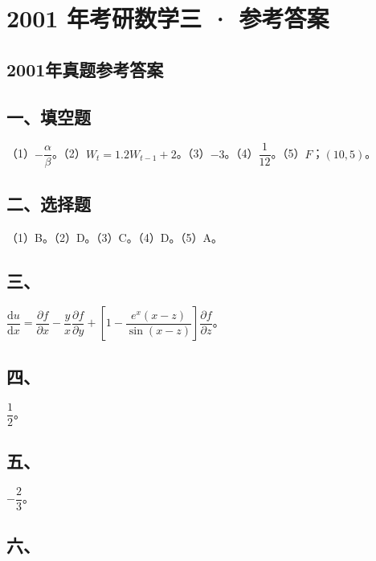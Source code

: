 \documentclass[UTF8,12pt]{ctexart}
\begin{document}
\section*{2001 年考研数学三 · 参考答案}
\subsection*{2001年真题参考答案}

\subsection*{一、填空题}

（1）\(\displaystyle -\dfrac{\displaystyle \alpha}{\displaystyle \beta}\)。（2）\(\displaystyle W_t=1.2W_{t-1}+2\)。（3）\(\displaystyle -3\)。（4）\(\displaystyle \dfrac{\displaystyle 1}{\displaystyle 12}\)。（5）\(\displaystyle F\)；\(\displaystyle (10,\allowbreak 5)\)。


\subsection*{二、选择题}

（1）B。（2）D。（3）C。（4）D。（5）A。


\subsection*{三、}

\(\displaystyle \dfrac{\displaystyle \mathrm du}{\displaystyle \mathrm dx}=\dfrac{\displaystyle \partial f}{\displaystyle \partial x}-\dfrac{\displaystyle y}{\displaystyle x}\dfrac{\displaystyle \partial f}{\displaystyle \partial y}+\left[1-\dfrac{\displaystyle e^x(x-z)}{\displaystyle \sin(x-z)}\right]\dfrac{\displaystyle \partial f}{\displaystyle \partial z}\)。


\subsection*{四、}

\(\displaystyle \dfrac{\displaystyle 1}{\displaystyle 2}\)。


\subsection*{五、}

\(\displaystyle -\dfrac{\displaystyle 2}{\displaystyle 3}\)。


\subsection*{六、}
\end{document}
